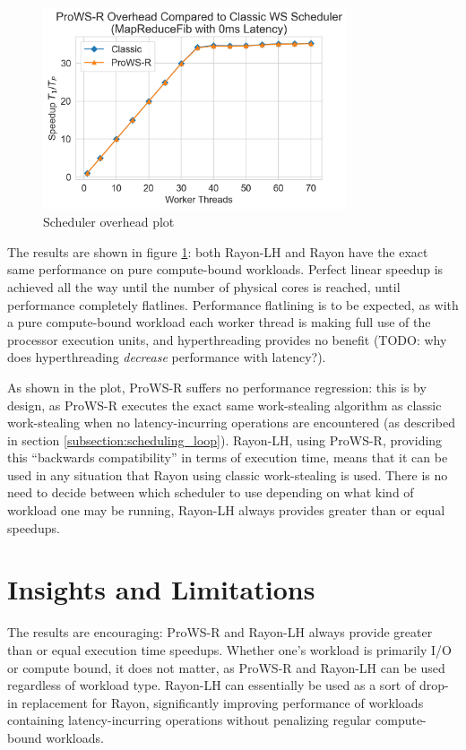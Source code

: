 \documentclass[bsc,frontabs,singlespacing,parskip,deptreport,normalheadings]{infthesis}
\begin{document}
\begin{figure}[ht]
    \centering
    \includegraphics[width=0.8\textwidth]{figures/overhead_plot.png}
    \caption{Scheduler overhead plot}
    \label{fig:overhead}
\end{figure}

The results are shown in figure \ref{fig:overhead}: both Rayon-LH and Rayon have
the exact same performance on pure compute-bound workloads. Perfect linear
speedup is achieved all the way until the number of physical cores is reached,
until performance completely flatlines. Performance flatlining is to be
expected, as with a pure compute-bound workload each worker thread is making
full use of the processor execution units, and hyperthreading provides no
benefit (TODO: why does hyperthreading \textit{decrease} performance with
latency?).

As shown in the plot, ProWS-R suffers no performance regression: this is by
design, as ProWS-R executes the exact same work-stealing algorithm as classic
work-stealing when no latency-incurring operations are encountered (as described
in section \ref{subsection:scheduling_loop}). Rayon-LH, using ProWS-R, providing
this ``backwards compatibility'' in terms of execution time, means that it can be
used in any situation that Rayon using classic work-stealing is used. There is
no need to decide between which scheduler to use depending on what kind of
workload one may be running, Rayon-LH always provides greater than or equal
speedups.

\section{Insights and Limitations}
\label{section:insights_and_limitations}

The results are encouraging: ProWS-R and Rayon-LH always provide greater than or
equal execution time speedups. Whether one's workload is primarily I/O or
compute bound, it does not matter, as ProWS-R and Rayon-LH can be used
regardless of workload type. Rayon-LH can essentially be used as a sort of
drop-in replacement for Rayon, significantly improving performance of workloads
containing latency-incurring operations without penalizing regular compute-bound
workloads.
\end{document}
